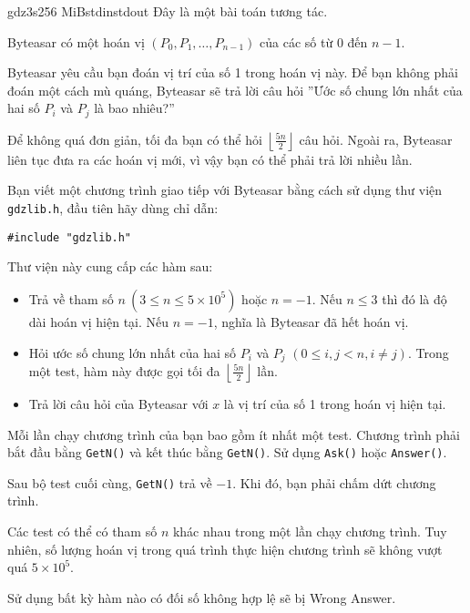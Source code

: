 \begin{problem}{gdz}{3s}{256 MiB}{stdin}{stdout}
Đây là một bài toán tương tác.

Byteasar có một hoán vị $(P_0, P_1, \dots,P_{n-1})$ của các số từ $0$ đến $n - 1$.

Byteasar yêu cầu bạn đoán vị trí của số 1 trong hoán vị này. Để bạn không phải đoán một cách mù quáng, 
Byteasar sẽ trả lời câu hỏi ”Ước số chung lớn nhất của hai số $P_i$ và $P_j$ là bao nhiêu?”

Để không quá đơn giản, tối đa bạn có thể hỏi $\left \lfloor \frac{5n}{2} \right \rfloor$ câu hỏi. 
Ngoài ra, Byteasar liên tục đưa ra các hoán vị mới, vì vậy bạn có thể phải trả lời nhiều lần.


Bạn viết một chương trình giao tiếp với Byteasar bằng cách sử dụng thư viện \texttt{gdzlib.h}, 
đầu tiên hãy dùng chỉ dẫn:

\begin{verbatim}
#include "gdzlib.h"
\end{verbatim}

Thư viện này cung cấp các hàm sau:

\begin{itemize}
  \item {} 
  Trả về tham số $n \ (3 \le n \le 5 \times 10^5)$ hoặc $n = -1$. 
  Nếu $n \le 3$ thì đó là độ dài hoán vị hiện tại. Nếu $n = -1$, nghĩa là Byteasar đã hết hoán vị.
  \item {}
  Hỏi ước số chung lớn nhất của hai số $P_i$ và $P_j$ $(0 \le i, j < n, i \ne j)$.
  Trong một test, hàm này được gọi tối đa $\left \lfloor \frac{5n}{2} \right \rfloor$ lần.
  \item {}
  Trả lời câu hỏi của Byteasar với $x$ là vị trí của số 1 trong hoán vị hiện tại.
\end{itemize}

Mỗi lần chạy chương trình của bạn bao gồm ít nhất một test. Chương trình phải bắt
đầu bằng \texttt{GetN()} và kết thúc bằng \texttt{GetN()}. Sử dụng \texttt{Ask()} hoặc \texttt{Answer()}.

Sau bộ test cuối cùng, \texttt{GetN()} trả về $-1$. Khi đó, bạn phải chấm dứt chương trình.

Các test có thể có tham số $n$ khác nhau trong một lần chạy chương trình. Tuy nhiên, số
lượng hoán vị trong quá trình thực hiện chương trình sẽ không vượt quá $5 \times 10^5$.

Sử dụng bất kỳ hàm nào có đối số không hợp lệ sẽ bị Wrong Answer.

\end{problem}